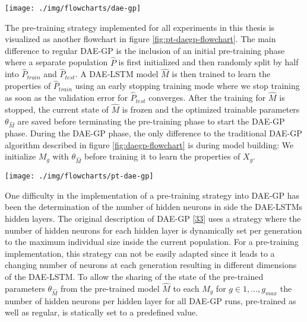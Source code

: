 \documentclass[
  11pt,
]{article}
\let\origfigure\figure
\let\endorigfigure\endfigure
\renewenvironment{figure}[1][2] {
    \expandafter\origfigure\expandafter[H]
} {
    \endorigfigure
}
\begin{document}
\begin{figure}[c]

{\centering \texttt{[image: ./img/flowcharts/dae-gp]} 

}

\caption{Regular DAE-GP Flowchart}\label{fig:daegp-flowchart}
\end{figure}

The pre-training strategy implemented for all experiments in this thesis is visualized as another flowchart in figure \ref{fig:pt-daegp-flowchart}.
The main difference to regular DAE-GP is the inclusion of an initial pre-training phase where a separate population \(\hat{P}\) is first initialized and then randomly split by half into \(\hat{P}_{train}\) and \(\hat{P}_{test}\).
A DAE-LSTM model \(\hat{M}\) is then trained to learn the properties of \(\hat{P}_{train}\) using an early stopping training mode where we stop training as soon as the validation error for \(\hat{P}_{test}\) converges.
After the training for \(\hat{M}\) is stopped, the current state of \(\hat{M}\) is frozen and the optimized trainable parameters \(\theta_{\hat{M}}\) are saved before terminating the pre-training phase to start the DAE-GP phase.
During the DAE-GP phase, the only difference to the traditional DAE-GP algorithm described in figure \ref{fig:daegp-flowchart} is during model building: We initialize \(M_g\) with \(\theta_{\hat{M}}\) before training it to learn the properties of \(X_g\).

\begin{figure}[c]

{\centering \texttt{[image: ./img/flowcharts/pt-dae-gp]} 

}

\caption{Pre-Trained DAE-GP Flowchart}\label{fig:pt-daegp-flowchart}
\end{figure}

One difficulty in the implementation of a pre-training strategy into DAE-GP has been the determination of the number of hidden neurons in side the DAE-LSTMs hidden layers. The original description of DAE-GP {[}\protect\hyperlink{ref-dae-gp_2020_rtree}{33}{]} uses a strategy where the number of hidden neurons for each hidden layer is dynamically set per generation to the maximum individual size inside the current population.
For a pre-training implementation, this strategy can not be easily adapted since it leads to a changing number of neurons at each generation resulting in different dimensions of the DAE-LSTM. To allow the sharing of the state of the pre-trained parameters \(\theta_{\hat{M}}\) from the pre-trained model \(\hat{M}\) to each \(M_g\) for \(g\in{1,...,g_{max}}\) the number of hidden neurons per hidden layer for all DAE-GP runs, pre-trained as well as regular, is statically set to a predefined value.
\end{document}
